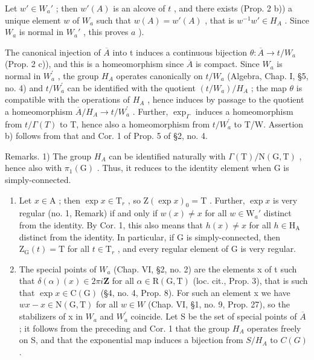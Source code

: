 Let \(w' \in W_a'\) ; then \(w'(A)\) is an alcove of \(t\) , and there exists (Prop. 2 b)) a unique element \(w\) of \(W_a\) such that \(w(A) = w'(A)\) , that is \(w^{-1}w' \in H_A\) . Since \(W_a\) is normal in \(W_a'\) , this proves \(a\) ).

The canonical injection of \(\overline{A}\) into t induces a continuous bijection \(\theta: \overline{A} \to t/W_{a}\) (Prop. 2 c)), and this is a homeomorphism since \(\overline{A}\) is compact. Since \(W_{a}\) is normal in \(W_{a}^{\prime}\) , the group \(H_{A}\) operates canonically on \(t/W_{a}\) (Algebra, Chap. I, §5, no. 4) and \(t/W_{a}^{\prime}\) can be identified with the quotient \((t/W_{a})/H_{A}\) ; the map \(\theta\) is compatible with the operations of \(H_{A}\) , hence induces by passage to the quotient a homeomorphism \(\overline{A}/H_{A} \to t/W_{a}^{\prime}\) . Further, \(\exp_{\Gamma}\) induces a homeomorphism from \(t/\Gamma(T)\) to T, hence also a homeomorphism from \(t/W_{a}^{\prime}\) to T/W. Assertion b) follows from that and Cor. 1 of Prop. 5 of §2, no. 4.

Remarks. 1) The group \(H_{A}\) can be identified naturally with \(\Gamma(\mathrm{T})/\mathrm{N}(\mathrm{G},\mathrm{T})\) , hence also with \(\pi_{1}(\mathrm{G})\) . Thus, it reduces to the identity element when G is simply-connected.

\begin{enumerate}
\def\labelenumi{\arabic{enumi})}
\setcounter{enumi}{1}
\item
  Let \(x \in \mathrm{A}\) ; then \(\exp x \in \mathrm{T}_r\) , so \(\mathrm{Z}(\exp x)_0 = \mathrm{T}\) . Further, \(\exp x\) is very regular (no. 1, Remark) if and only if \(w(x) \neq x\) for all \(w \in \mathrm{W}_a'\) distinct from the identity. By Cor. 1, this also means that \(h(x) \neq x\) for all \(h \in \mathrm{H}_{\mathrm{A}}\) distinct from the identity. In particular, if \(\mathrm{G}\) is simply-connected, then \(\mathrm{Z}_{\mathrm{G}}(t) = \mathrm{T}\) for all \(t \in \mathrm{T}_r\) , and every regular element of \(\mathrm{G}\) is very regular.
\item
  The special points of \(W_{a}\) (Chap. VI, §2, no. 2) are the elements x of t such that \(\delta(\alpha)(x) \in 2\pi i\mathbf{Z}\) for all \(\alpha \in \mathrm{R}(\mathrm{G}, \mathrm{T})\) (loc. cit., Prop. 3), that is such that \(\exp x \in \mathrm{C}(\mathrm{G})\) (§4, no. 4, Prop. 8). For such an element x we have \(wx - x \in \mathrm{N}(\mathrm{G}, \mathrm{T})\) for all \(w \in W\) (Chap. VI, §1, no. 9, Prop. 27), so the stabilizers of x in \(W_{a}\) and \(W_{a}^{\prime}\) coincide. Let S be the set of special points of \(\overline{A}\) ; it follows from the preceding and Cor. 1 that the group \(H_{A}\) operates freely on S, and that the exponential map induces a bijection from \(S/H_{A}\) to \(C(G)\) .
\end{enumerate}

